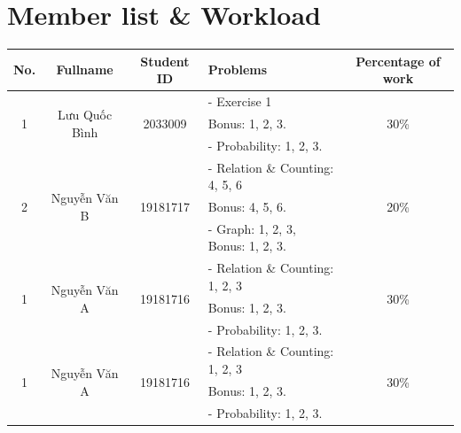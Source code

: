 \documentclass[a4paper]{article}
\begin{document}
    \newpage
    \tableofcontents
    \newpage
    \section{Member list \& Workload}

    \begin{center}
        \begin{tabular}{|c|c|c|l|c|}
            \hline
            \textbf{No.}       & \textbf{Fullname}              & \textbf{Student ID}       & \textbf{Problems}                 & \textbf{Percentage of work} \\
            \hline
            \multirow{3}{*}{1} & \multirow{3}{*}{Lưu Quốc Bình} & \multirow{3}{*}{2033009}  & - Exercise 1 & \multirow{3}{*}{30\%}\\
            &                                &                           & Bonus: 1, 2, 3.                   &                             \\
            &                                &                           & - Probability: 1, 2, 3.           &                             \\
            \hline
            \multirow{3}{*}{2} & \multirow{3}{*}{Nguyễn Văn B}  & \multirow{3}{*}{19181717} & - Relation \& Counting: 4, 5, 6& \multirow{3}{*}{20\%}\\
            &                                &                           & Bonus: 4, 5, 6.                   &                             \\
            &                                &                           & - Graph: 1, 2, 3, Bonus: 1, 2, 3. &                             \\
            \hline
            \multirow{3}{*}{1} & \multirow{3}{*}{Nguyễn Văn A}  & \multirow{3}{*}{19181716} & - Relation \& Counting: 1, 2, 3& \multirow{3}{*}{30\%}\\
            &                                &                           & Bonus: 1, 2, 3.                   &                             \\
            &                                &                           & - Probability: 1, 2, 3.           &                             \\
            \hline
            \multirow{3}{*}{1} & \multirow{3}{*}{Nguyễn Văn A}  & \multirow{3}{*}{19181716} & - Relation \& Counting: 1, 2, 3& \multirow{3}{*}{30\%}\\
            &                                &                           & Bonus: 1, 2, 3.                   &                             \\
            &                                &                           & - Probability: 1, 2, 3.           &                             \\
            \hline
        \end{tabular}
    \end{center}
\end{document}

